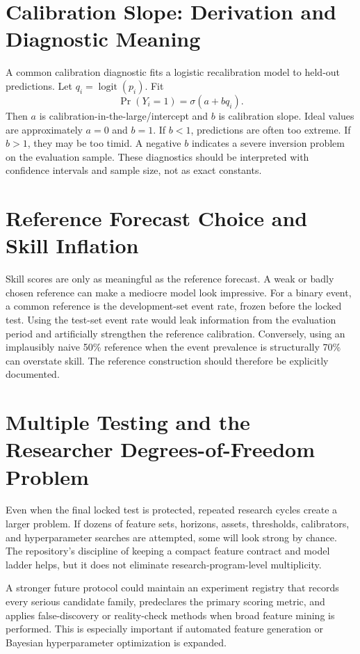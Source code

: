 \documentclass[11pt]{article}
\newcommand{\logit}{\operatorname{logit}}
\begin{document}
\section{Calibration Slope: Derivation and Diagnostic Meaning}
A common calibration diagnostic fits a logistic recalibration model to held-out predictions. Let $q_i=\logit(p_i)$. Fit
\begin{equation}
\Pr(Y_i=1)=\sigma(a+bq_i).
\end{equation}
Then $a$ is calibration-in-the-large/intercept and $b$ is calibration slope. Ideal values are approximately $a=0$ and $b=1$. If $b<1$, predictions are often too extreme. If $b>1$, they may be too timid. A negative $b$ indicates a severe inversion problem on the evaluation sample. These diagnostics should be interpreted with confidence intervals and sample size, not as exact constants.

\section{Reference Forecast Choice and Skill Inflation}
Skill scores are only as meaningful as the reference forecast. A weak or badly chosen reference can make a mediocre model look impressive. For a binary event, a common reference is the development-set event rate, frozen before the locked test. Using the test-set event rate would leak information from the evaluation period and artificially strengthen the reference calibration. Conversely, using an implausibly naive 50\% reference when the event prevalence is structurally 70\% can overstate skill. The reference construction should therefore be explicitly documented.

\section{Multiple Testing and the Researcher Degrees-of-Freedom Problem}
Even when the final locked test is protected, repeated research cycles create a larger problem. If dozens of feature sets, horizons, assets, thresholds, calibrators, and hyperparameter searches are attempted, some will look strong by chance. The repository's discipline of keeping a compact feature contract and model ladder helps, but it does not eliminate research-program-level multiplicity.

A stronger future protocol could maintain an experiment registry that records every serious candidate family, predeclares the primary scoring metric, and applies false-discovery or reality-check methods when broad feature mining is performed. This is especially important if automated feature generation or Bayesian hyperparameter optimization is expanded.
\end{document}
